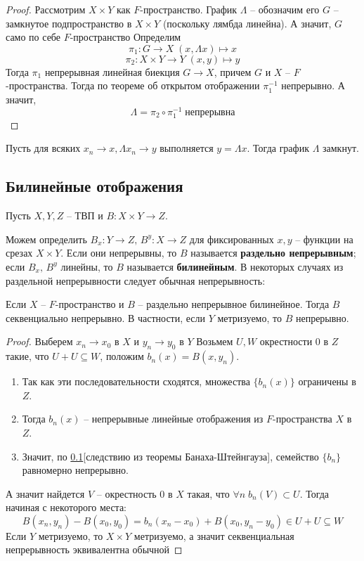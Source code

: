 \documentclass[12pt, a4paper, oneside]{book}
\begin{document}
\begin{proof}
    Рассмотрим $X\times Y$ как $F$-пространство.
График $\Lambda$ -- обозначим его $G$ -- замкнутое подпространство в $X\times Y$ (поскольку лямбда линейна). А значит, $G$ само по себе $F$-пространство
    Определим $$\pi_1: G \to X\; (x,\Lambda x) \mapsto x$$
    $$\pi_2: X\times Y \to Y\; (x,y) \mapsto y$$
    Тогда $\pi_1$ непрерывная линейная биекция $G\to X$, причем $G$ и $X$ -- $F$-пространства. Тогда по теореме об открытом отображении $\pi_1^{-1}$ непрерывно. А значит,
     $$\Lambda = \pi_2 \circ \pi_1^{-1} \; \text{непрерывна}$$
\end{proof}

\begin{remark}
Пусть для всяких $x_n \to x, \Lambda x_n \to y$ выполняется $y = \Lambda x$. Тогда график $\Lambda$ замкнут.
\end{remark}

\subsection{Билинейные отображения}
Пусть $X,Y,Z$ -- ТВП и $B: X\times Y \to Z$.

Можем определить $B_x:Y\to Z,\, B^y:X \to Z$ для фиксированных $x,y$ -- функции на срезах $X\times Y$.  Если они непрерывны, то $B$ называется \textbf{раздельно непрерывным}; если $B_x, \, B^y$ линейны, то $B$ называется \textbf{билинейным}.
В некоторых случаях из раздельной непрерывности следует обычная непрерывность:
\begin{theorem}
    Если $X$ -- $F$-пространство и $B$ -- раздельно непрерывное билинейное. Тогда $B$ секвенциально непрерывно. В частности, если $Y$ метризуемо, то $B$ непрерывно.
\end{theorem}
\begin{proof}
    Выберем $x_n \to x_0$ в $X$ и $y_n \to y_0$ в $Y$
Возьмем $U, W$ окрестности 0 в $Z$ такие, что $U+U \subseteq W$, положим $b_n(x) = B(x,y_n)$.
    \begin{enumerate}
        \item  Так как эти последовательности сходятся, множества $\{b_n(x)\}$ ограничены в $Z$.
        \item  Тогда $b_n(x)$ --  непрерывные линейные отображения из $F$-пространства $X$ в $Z$.
        \item  Значит, по \ref{}[следствию из теоремы Банаха-Штейнгауза], семейство $\{b_n\}$ равномерно непрерывно.
    \end{enumerate}
    А значит найдется $V$ -- окрестность 0 в $X$ такая, что $\forall n\; b_n(V) \subset U$. Тогда начиная с некоторого места:
    $$B(x_n, y_n) - B(x_0,y_0) = b_n(x_n-x_0)+B(x_0,y_n-y_0) \in U + U \subseteq W$$
    Если $Y$ метризуемо, то $X\times Y$ метризуемо, а значит секвенциальная непрерывность эквивалентна обычной
\end{proof}
    
    
\end{document}
